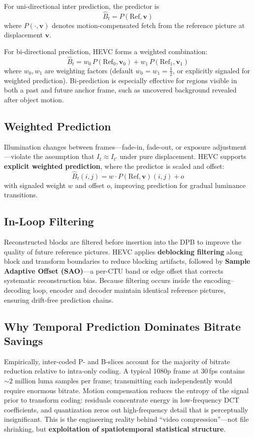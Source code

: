 \documentclass[11pt,journal,onecolumn]{IEEEtran}
\begin{document}
For uni-directional inter prediction, the predictor is
\begin{equation}
\hat{B}_t = P(\mathrm{Ref}, \mathbf{v})
\end{equation}
where $P(\cdot, \mathbf{v})$ denotes motion-compensated fetch from the reference picture at displacement $\mathbf{v}$.

For bi-directional prediction, HEVC forms a weighted combination:
\begin{equation}
\hat{B}_t = w_0 \, P(\mathrm{Ref}_0, \mathbf{v}_0) + w_1 \, P(\mathrm{Ref}_1, \mathbf{v}_1)
\end{equation}
where $w_0, w_1$ are weighting factors (default $w_0 = w_1 = \tfrac{1}{2}$, or explicitly signaled for weighted prediction). Bi-prediction is especially effective for regions visible in both a past and future anchor frame, such as uncovered background revealed after object motion.

\subsection{Weighted Prediction}
Illumination changes between frames---fade-in, fade-out, or exposure adjustment---violate the assumption that $I_t \approx I_{t'}$ under pure displacement. HEVC supports \textbf{explicit weighted prediction}, where the predictor is scaled and offset:
\begin{equation}
\hat{B}_t(i, j) = w \cdot P(\mathrm{Ref}, \mathbf{v})(i, j) + o
\end{equation}
with signaled weight $w$ and offset $o$, improving prediction for gradual luminance transitions.

\subsection{In-Loop Filtering}
Reconstructed blocks are filtered before insertion into the DPB to improve the quality of future reference pictures. HEVC applies \textbf{deblocking filtering} along block and transform boundaries to reduce blocking artifacts, followed by \textbf{Sample Adaptive Offset (SAO)}---a per-CTU band or edge offset that corrects systematic reconstruction bias. Because filtering occurs inside the encoding--decoding loop, encoder and decoder maintain identical reference pictures, ensuring drift-free prediction chains.

\subsection{Why Temporal Prediction Dominates Bitrate Savings}
Empirically, inter-coded P- and B-slices account for the majority of bitrate reduction relative to intra-only coding. A typical 1080p frame at 30\,fps contains $\sim 2$ million luma samples per frame; transmitting each independently would require enormous bitrate. Motion compensation reduces the entropy of the signal prior to transform coding: residuals concentrate energy in low-frequency DCT coefficients, and quantization zeros out high-frequency detail that is perceptually insignificant. This is the engineering reality behind ``video compression''---not file shrinking, but \textbf{exploitation of spatiotemporal statistical structure}.
\end{document}
